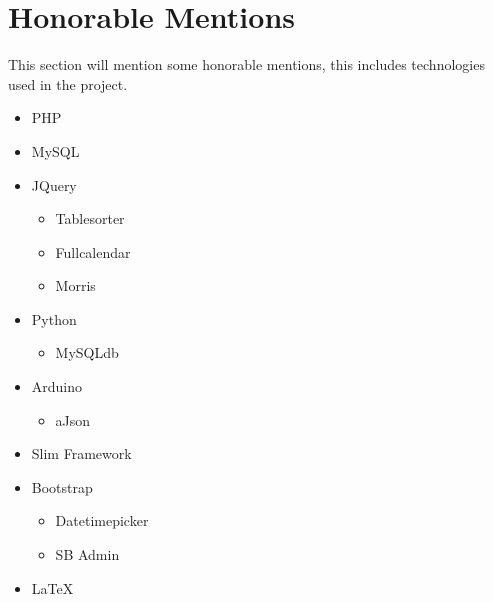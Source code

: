 \chapter{Honorable Mentions}
This section will mention some honorable mentions, this includes technologies used in the project.
\begin{itemize}
\item PHP
\item MySQL
\item JQuery
	\begin{itemize}
	\item Tablesorter
	\item Fullcalendar
	\item Morris
	\end{itemize}
\item Python
	\begin{itemize}
	\item MySQLdb
	\end{itemize}
\item Arduino
	\begin{itemize}
	\item aJson
	\end{itemize}
\item Slim Framework
\item Bootstrap
	\begin{itemize}
	\item Datetimepicker
	\item SB Admin
	\end{itemize}
\item \LaTeX
\end{itemize}